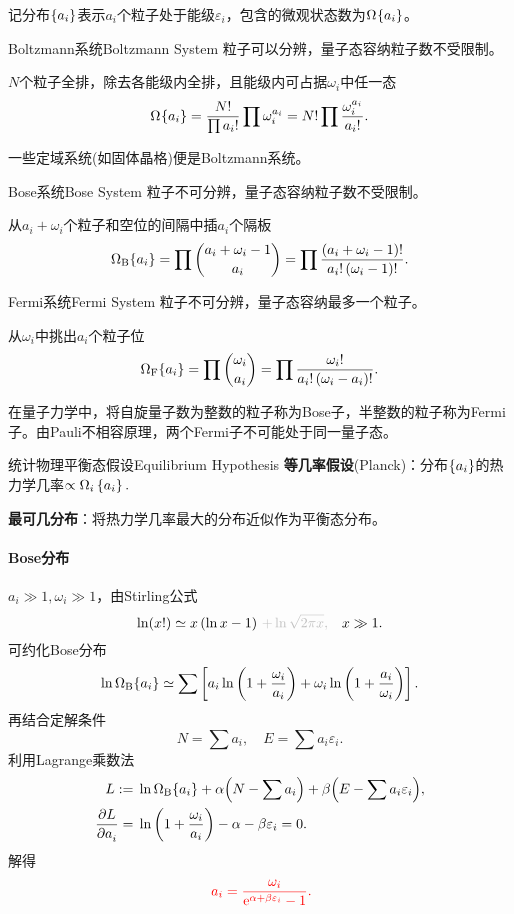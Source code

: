 记分布$\hkh{a_i}$表示$a_i$个粒子处于能级$\varepsilon_i$，包含的微观状态数为$\Om$。
\begin{definition}{Boltzmann系统}{Boltzmann System}
	粒子可以分辨，量子态容纳粒子数不受限制。

	$N$个粒子全排，除去各能级内全排，且能级内可占据$\omega_i$中任一态
	\begin{align}
		\Om=\frac{N!}{\prod a_i!}\prod\omega_i^{a_i}=N!\prod\frac{\omega_i^{a_i}}{a_i!}.
	\end{align}
\end{definition}
一些定域系统(如固体晶格)便是Boltzmann系统。
\begin{definition}{Bose系统}{Bose System}
	粒子不可分辨，量子态容纳粒子数不受限制。

	从$a_i+\omega_i$个粒子和空位的间隔中插$a_i$个隔板
	\begin{align}
		\Om[B]=\prod\binom{a_i+\omega_i-1}{a_i}=\prod\frac{\kh{a_i+\omega_i-1}!}{a_i!\kh{\omega_i-1}!}.
	\end{align}
\end{definition}
\begin{definition}{Fermi系统}{Fermi System}
	粒子不可分辨，量子态容纳最多一个粒子。

	从$\omega_i$中挑出$a_i$个粒子位
	\begin{align}
		\Om[F]=\prod\binom{\omega_i}{a_i}=\prod\frac{\omega_i!}{a_i!\kh{\omega_i-a_i}!}.
	\end{align}
\end{definition}
在量子力学中，将自旋量子数为整数的粒子称为Bose子，半整数的粒子称为Fermi子。由Pauli不相容原理，两个Fermi子不可能处于同一量子态。 
\begin{theorem}{统计物理平衡态假设}{Equilibrium Hypothesis}
	\textbf{等几率假设}(Planck)：分布$\hkh{a_i}$的热力学几率$\propto\Omega_i\hkh{a_i}.$

	\textbf{最可几分布}：将热力学几率最大的分布近似作为平衡态分布。
\end{theorem}
\paragraph{Bose分布}
$a_i\gg 1,\omega_i\gg 1$，由Stirling公式
\[
	\ln(x!)\simeq x\kh{\ln x-1}\,{\color{lightgray}+\ln\sqrt{2\pi x},}\quad x\gg 1.
\]
可约化Bose分布
\begin{align*}
	\ln\Om[B]\simeq\sum\fkh{a_i\ln\kh{1+\frac{\omega_i}{a_i}}+\omega_i\ln\kh{1+\frac{a_i}{\omega_i}}}.
\end{align*}
再结合定解条件
\[
	N=\sum a_i,\quad E=\sum a_i\varepsilon_i.
\]
利用Lagrange乘数法
\begin{align*}
	L:={}&\ln\Om[B]+\alpha\Bigkh{N-\sum a_i}+\beta\Bigkh{E-\sum a_i\varepsilon_i},\\
	\pv L{a_i}={}&\ln\kh{1+\frac{\omega_i}{a_i}}-\alpha-\beta\ve_i=0.
\end{align*}
解得
\begin{align}
	\spark{a_i=\frac{\omega_i}{\e{\alpha+\beta\varepsilon_i}-1}.}
\end{align}

